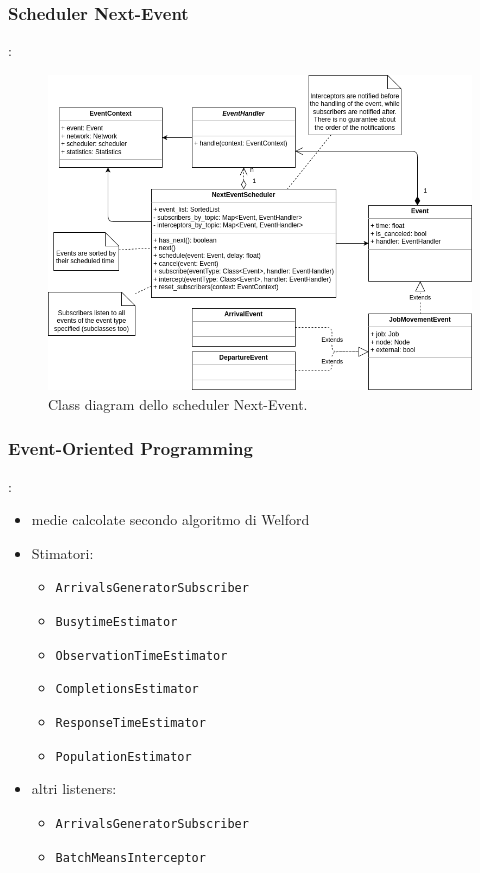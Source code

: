 \subsubsection{Scheduler Next-Event}

\begin{frame}{\subsecname: \subsubsecname}
    \begin{figure}
        \centering
        \includegraphics[width=0.7\linewidth]{figs/diagrams/scheduler.drawio.png}
        \caption{Class diagram dello scheduler Next-Event.}
        \label{fig:enter-label}
    \end{figure}
\end{frame}

\subsubsection{Event-Oriented Programming}
\begin{frame}{\subsecname: \subsubsecname}
\begin{itemize}
    \item medie calcolate secondo algoritmo di Welford \citep{des}
    \item Stimatori:
    \begin{itemize}
        \item \texttt{ArrivalsGeneratorSubscriber}
        \item \texttt{BusytimeEstimator}
        \item \texttt{ObservationTimeEstimator}
        \item \texttt{CompletionsEstimator}
        \item \texttt{ResponseTimeEstimator}
        \item \texttt{PopulationEstimator}
    \end{itemize}
    \item altri listeners:
        \begin{itemize}
            \item \texttt{ArrivalsGeneratorSubscriber}
            \item \texttt{BatchMeansInterceptor}
        \end{itemize}
\end{itemize}    
\end{frame}


